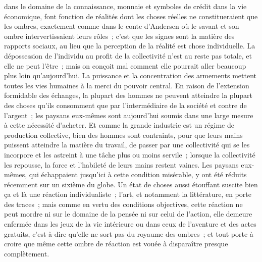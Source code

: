 \documentclass[french,twoside]{book} %
\begin{document}
dans le domaine de la connaissance, monnaie et symboles de crédit dans la vie économique, font fonction de réalités dont les choses réelles ne constitueraient que les ombres, exactement comme dans le conte d'Andersen où le savant et son ombre intervertissaient leurs rôles ; c'est que les signes sont la matière des rapports sociaux, au lieu que la perception de la réalité est chose individuelle. La dépossession de l'individu au profit de la collectivité n'est au reste pas totale, et elle ne peut l’être ; mais on conçoit mal comment elle pourrait aller beaucoup plus loin qu'aujourd'hui. La puissance et la concentration des armements mettent toutes les vies humaines à la merci du pouvoir central. En raison de l'extension formidable des échanges, la plupart des hommes ne peuvent atteindre la plupart des choses qu’ils consomment que par l'intermédiaire de la société et contre de l'argent ; les paysans eux-mêmes sont aujourd'hui soumis dans une large mesure à cette nécessité d'acheter. Et comme la grande industrie est un régime de production collective, bien des hommes sont contraints, pour que leurs mains puissent atteindre la matière du travail, de passer par une collectivité qui se les incorpore et les astreint à une tâche plus ou moins servile ; lorsque la collectivité les repousse, la force et l'habileté de leurs mains restent vaines. Les paysans eux-mêmes, qui échappaient jusqu'ici à cette condition misérable, y ont été réduits récemment sur un sixième du globe. Un état de choses aussi étouffant suscite bien ça et là une réaction individualiste ; l'art, et notamment la littérature, en porte des traces ; mais comme en vertu des conditions objectives, cette réaction ne peut mordre ni sur le domaine de la pensée ni sur celui de l'action, elle demeure enfermée dans les jeux de la vie intérieure ou dans ceux de l'aventure et des actes gratuits, c'est-à-dire qu'elle ne sort pas du royaume des ombres ; et tout porte à croire que même cette ombre de réaction est vouée à disparaître presque complètement.\par
\end{document}
